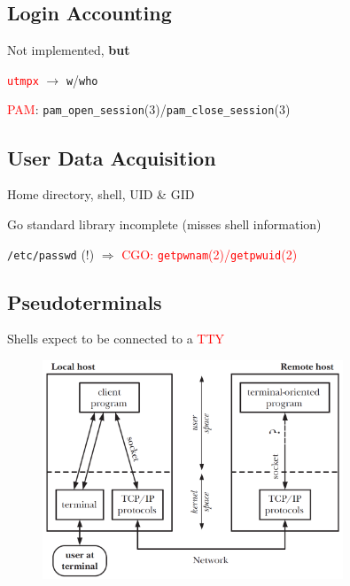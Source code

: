\documentclass[
	xcolor=dvipsnames,
	handout
]{beamer}
\newenvironment{zhawframe}[1][]
{\begin{frame}[environment=fr,#1]{\insertsubsectionhead}{\insertsectionhead}}
{\end{frame}
}
\begin{document}
\subsection{Login Accounting}
\begin{zhawframe}
 Not implemented, \textbf{but}

 \textcolor{red}{\texttt{utmpx}} $\rightarrow$ \texttt{w}/\texttt{who}

 \textcolor{red}{PAM}: \texttt{pam\_{}open\_{}session}(3)/\texttt{pam\_{}close\_{}session}(3)
\end{zhawframe}

\subsection{User Data Acquisition}
\begin{zhawframe}
 Home directory, shell, UID \& GID

 Go standard library incomplete (misses shell information)

 \texttt{/etc/passwd} (!) $\Rightarrow$ \textcolor{red}{CGO: \texttt{getpwnam}(2)/\texttt{getpwuid}(2)}
\end{zhawframe}

\subsection{Pseudoterminals}
\begin{zhawframe}
Shells expect to be connected to a \textcolor{red}{TTY}
\begin{figure}[ht]
\includegraphics[width=0.8\textwidth]{PseudoterminalProblem}
\end{figure}
\end{zhawframe}
\end{document}
